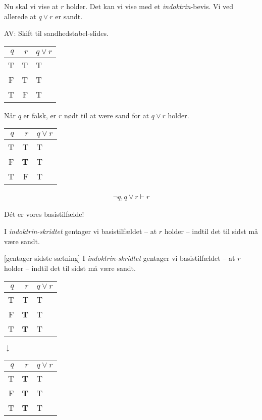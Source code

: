 \documentclass[a4paper,11pt]{article}
\begin{document}
\begin{sketch}
 Nu skal vi vise at $r$ holder. Det kan vi vise med et \textit{indoktrin}-bevis. Vi ved allerede at $q \lor r$ er sandt.

{\scene AV: Skift til sandhedstabel-slides.}
\begin{center}
\begin{tabular}{r|r|l}
$q$ & $r$ & $q \lor r$\\\hline
T & T & T\\\hline
F & T & T\\\hline
T & F & T
\end{tabular}
\end{center}

 Når $q$ er falsk, er $r$ nødt til at være sand for at $q \lor r$ holder.

\begin{center}
\begin{tabular}{r|r|l}
$q$ & $r$ & $q \lor r$\\\hline
T & T & T\\\hline
F & \textbf{T} & T\\\hline
T & F & T
\end{tabular}

\begin{align*}
\lnot q, q \lor r \vdash r
\end{align*}
\end{center}

 Dét er vores basistilfælde!

 I \textit{indoktrin-skridtet} gentager vi basistilfældet -- at $r$ holder -- indtil det til sidst må være sandt.

[gentager sidste sætning] I \textit{indoktrin-skridtet} gentager vi basistilfældet -- at $r$ holder -- indtil det til sidst må være sandt.


\begin{center}
\begin{tabular}{r|r|l}
$q$ & $r$ & $q \lor r$\\\hline
T & T & T\\\hline
F & \textbf{T} & T\\\hline
T & \textbf{T} & T
\end{tabular}

$\downarrow$

\begin{tabular}{r|r|l}
$q$ & $r$ & $q \lor r$\\\hline
T & \textbf{T} & T\\\hline
F & \textbf{T} & T\\\hline
T & \textbf{T} & T
\end{tabular}
\end{center}



\end{sketch}
\end{document}
